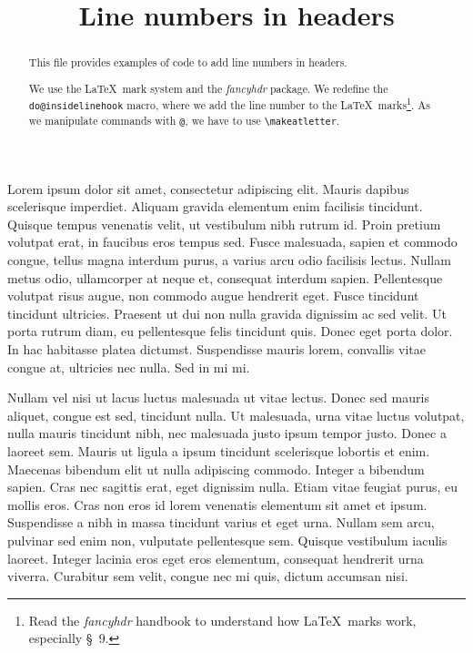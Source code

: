 \documentclass[]{article}
\begin{document}
\begin{english}
\title{Line numbers in headers}
\maketitle
\begin{abstract}
This file provides examples of code to add line numbers in headers.

We use the \LaTeX\ mark system and the \emph{fancyhdr} package.
We redefine the \verb+do@insidelinehook+ macro, where we add the line number to the \LaTeX\ marks\footnote{Read the \emph{fancyhdr} handbook to understand how \LaTeX\ marks work, especially §~9.}. As we manipulate commands with \verb+@+, we have to use \verb+\makeatletter+.

\end{abstract}
\end{english}


\beginnumbering
\autopar

Lorem ipsum dolor sit amet, consectetur adipiscing elit. Mauris dapibus scelerisque imperdiet. Aliquam gravida elementum enim facilisis tincidunt. Quisque tempus venenatis velit, ut vestibulum nibh rutrum id. Proin pretium volutpat erat, in faucibus eros tempus sed. Fusce malesuada, sapien et commodo congue, tellus magna interdum purus, a varius arcu odio facilisis lectus. Nullam metus odio, ullamcorper at neque et, consequat interdum sapien. Pellentesque volutpat risus augue, non commodo augue hendrerit eget. Fusce tincidunt tincidunt ultricies. Praesent ut dui non nulla gravida dignissim ac sed velit. Ut porta rutrum diam, eu pellentesque felis tincidunt quis. Donec eget porta dolor. In hac habitasse platea dictumst. Suspendisse mauris lorem, convallis vitae congue at, ultricies nec nulla. Sed in mi mi.

Nullam vel nisi ut lacus luctus malesuada ut vitae lectus. Donec sed mauris aliquet, congue est sed, tincidunt nulla. Ut malesuada, urna vitae luctus volutpat, nulla mauris tincidunt nibh, nec malesuada justo ipsum tempor justo. Donec a laoreet sem. Mauris ut ligula a ipsum tincidunt scelerisque lobortis et enim. Maecenas bibendum elit ut nulla adipiscing commodo. Integer a bibendum sapien. Cras nec sagittis erat, eget dignissim nulla. Etiam vitae feugiat purus, eu mollis eros. Cras non eros id lorem venenatis elementum sit amet et ipsum. Suspendisse a nibh in massa tincidunt varius et eget urna. Nullam sem arcu, pulvinar sed enim non, vulputate pellentesque sem. Quisque vestibulum iaculis laoreet. Integer lacinia eros eget eros elementum, consequat hendrerit urna viverra. Curabitur sem velit, congue nec mi quis, dictum accumsan nisi.
\end{document}
